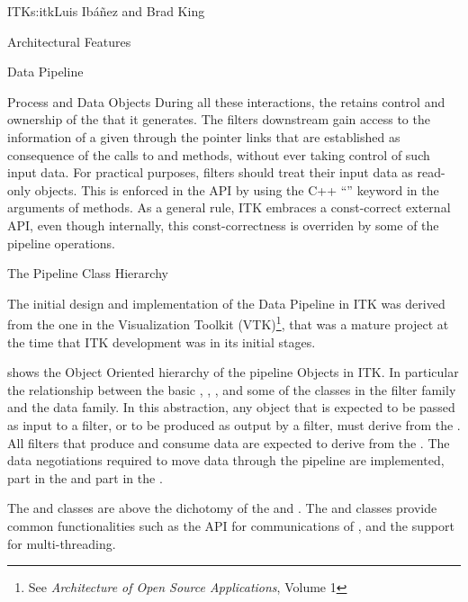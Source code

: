 \begin{aosachapter}{ITK}{s:itk}{Luis Ib\'{a}\~{n}ez and Brad King}
\begin{aosasect1}{Architectural Features}
\begin{aosasect2}{Data Pipeline}
\begin{aosasect3}{Process and Data Objects}
During all these interactions, the  retains
control and ownership of the  that it generates.
The filters downstream gain access to the information of a given
 through the pointer links that are established
as consequence of the calls to  and
 methods, without ever taking control of such
input data. For practical purposes, filters should treat their
input data as read-only objects. This is enforced in the API by
using the C++ ``'' keyword in the arguments of
 methods. As a general rule, ITK embraces a
const-correct external API, even though internally, this
const-correctness is overriden by some of the pipeline operations.


\end{aosasect3}

\begin{aosasect3}{The Pipeline Class Hierarchy}

The initial design and implementation of the Data Pipeline in ITK was derived
from the one in the Visualization Toolkit (VTK)\footnote{See \emph{Architecture
of Open Source Applications}, Volume 1}, that was a mature project at the time
that ITK development was in its initial stages.

 shows the Object Oriented
hierarchy of the pipeline Objects in ITK. In particular the relationship
between the basic , , , and
some of the classes in the filter family and the data family. In this
abstraction, any object that is expected to be passed as input to a filter, or
to be produced as output by a filter, must derive from the . All
filters that produce and consume data are expected to derive from the
. The data negotiations required to move data through the
pipeline are implemented, part in the  and part in the
.


The  and  classes are above the
dichotomy of the  and . The
 and  classes provide common
functionalities such as the API for communications of ,
and the support for multi-threading.


\end{aosasect3}
\end{aosasect2}
\end{aosasect1}
\end{aosachapter}
